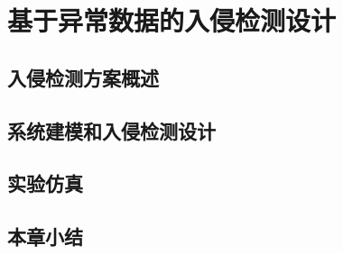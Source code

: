 
\chapter{基于异常数据的入侵检测设计}
\label{chap:data detection}

\section{入侵检测方案概述}
\label{sec:list}



\section{系统建模和入侵检测设计}
\label{sec:matheq}


\section{实验仿真}
\label{sec:insertimage}

\section{本章小结}
\label{sec:insertimage}

